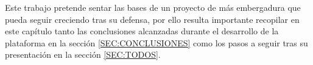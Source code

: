 
Este trabajo pretende sentar las bases de un proyecto de más embergadura que pueda seguir creciendo tras su defensa, por ello resulta importante recopilar en este capítulo tanto las conclusiones alcanzadas durante el desarrollo de la plataforma en la sección \ref{SEC:CONCLUSIONES} como los pasos a seguir tras su presentación en la sección \ref{SEC:TODOS}.
